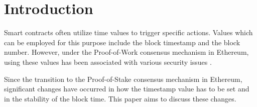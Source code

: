 \section{Introduction}

Smart contracts often utilize time values to trigger specific actions. Values
which can be employed for this purpose include the block timestamp and
the block number. However, under the Proof-of-Work consensus mechanism in
Ethereum, using these values has been associated with various security issues
\cite{swc116} \cite{Conkas2021} \cite{DASP2018} \cite{Osiris2018}
\cite{Oyente2016}.

Since the transition to the Proof-of-Stake consensus mechanism in
Ethereum, significant changes have occurred in how the timestamp value has to
be set and in the stability of the block time. This paper aims to discuss these
changes. 


